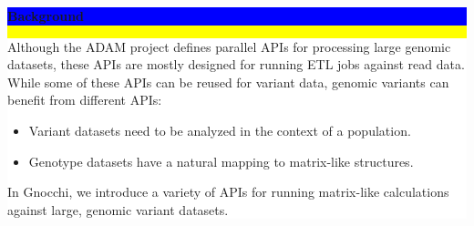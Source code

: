 \documentclass[11pt]{a0poster}
\begin{document}
\noindent\colorbox{Yellow}{
\begin{minipage}[t][2045pt][t]{\linewidth}

\noindent\begin{minipage}{0.025\linewidth}
\hfill
\pagebreak
\end{minipage}
\begin{minipage}{0.3\linewidth}
\vspace{75pt}
\colorbox{Blue}{
\begin{minipage}{\linewidth}
\vspace{25pt}
\begin{center}
\Huge \bf \color{White} Background
\end{center}
\vspace{10pt}
\end{minipage}
}
\colorbox{White}{
\begin{minipage}[t][700pt][t]{\linewidth}
\color{Blue}
\vspace{20pt}
\LARGE
Although the ADAM project defines parallel APIs for processing large genomic
datasets, these APIs are mostly designed for running ETL jobs against read
data. While some of these APIs can be reused for variant data, genomic variants
can benefit from different APIs:

\vspace{33pt}
\begin{itemize}
\item Variant datasets need to be analyzed in the context of a population.
\item Genotype datasets have a natural mapping to matrix-like structures.
\end{itemize}
\vspace{33pt}

In Gnocchi, we introduce a variety of APIs for running matrix-like calculations
against large, genomic variant datasets.
\hfill
\pagebreak
\end{minipage}
}


\end{minipage}
\end{minipage}}
\end{document}
